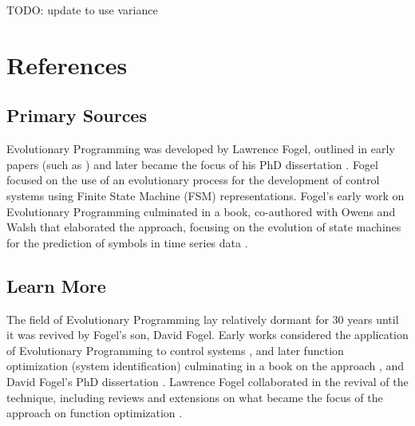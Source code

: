 \documentclass[a4paper, 11pt]{article}
\begin{document}
TODO: update to use variance




\section{References}
\label{sec:references}


% 
% 
\subsection{Primary Sources}
Evolutionary Programming was developed by Lawrence Fogel, outlined in early papers (such as \cite{Fogel1962}) and later became the focus of his PhD dissertation \cite{Fogel1964}. Fogel focused on the use of an evolutionary process for the development of control systems using Finite State Machine (FSM) representations. 
Fogel's early work on Evolutionary Programming culminated in a book, co-authored with Owens and Walsh that elaborated the approach, focusing on the evolution of state machines for the prediction of symbols in time series data \cite{Fogel1966}.

% 
% 
\subsection{Learn More}
The field of Evolutionary Programming lay relatively dormant for 30 years until it was revived by Fogel's son, David Fogel. Early works considered the application of Evolutionary Programming to control systems \cite{Sebald1990}, and later function optimization (system identification) culminating in a book on the approach \cite{Fogel1991}, and David Fogel's PhD dissertation \cite{Fogel1992}.
Lawrence Fogel collaborated in the revival of the technique, including reviews \cite{Fogel1990, Fogel1994} and extensions on what became the focus of the approach on function optimization \cite{Fogel1991a}.
\end{document}
